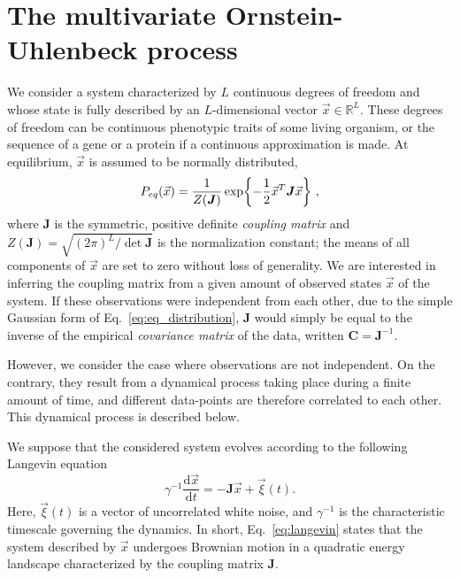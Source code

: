 \documentclass[preprint,amsmath,amssymb,superscriptaddress,showpacs,pre]{revtex4-1}
\let\originalleft\left
\let\originalright\right
\renewcommand{\left}{\mathopen{}\mathclose\bgroup\originalleft}
\renewcommand{\right}{\aftergroup\egroup\originalright}
\def\vx{\vec x}
\newcommand{\curlynormal}[1]{\exp\left\{-\frac{1}{2} #1 \right\}}
\begin{document}
\section{The multivariate Ornstein-Uhlenbeck process}
\label{sec:ornstein_uhlenbeck_dynamics}

We consider a system characterized by $L$ continuous degrees of freedom and whose state is fully described by an $L$-dimensional vector $\vx\in\mathbb{R}^L$. These degrees of freedom can be continuous phenotypic traits of some living organism, or the sequence of a gene or a protein if a continuous approximation is made. 
At equilibrium, $\vx$ is assumed to be normally distributed,
\begin{equation}
	P_{eq}(\vx) = \frac{1}{Z(\bm{J})}\curlynormal{\vx^T\bm{J}\vx}\ ,
	\label{eq:eq_distribution}
\end{equation}
where $\bm{J}$ is the symmetric, positive definite \emph{coupling matrix} and $Z(\bm{J}) = \sqrt{(2\pi)^L/\det \bm{J}}$ is the normalization constant; the means of all components of $\vx$ are set to zero without loss of generality. 
We are interested in inferring the coupling matrix from a given amount of observed states $\vx$ of the system.
If these observations were independent from each other, due to the simple Gaussian form of Eq.~\eqref{eq:eq_distribution}, $\bm{J}$ would simply be equal to the inverse of the empirical \emph{covariance matrix} of the data, written $\bm{C}=\bm{J}^{-1}$. 

However, we consider the case where observations are not independent. 
On the contrary, they result from a dynamical process taking place during a finite amount of time, and different data-points are therefore correlated to each other.
This dynamical process is described below.

We suppose that the considered system evolves according to the following Langevin equation 
\begin{equation}
	\gamma^{-1}\frac{\text{d}\vx}{\text{d}t} = - \bm{J}\vx + \vec{\xi}(t).
	\label{eq:langevin}
\end{equation}
Here, $\vec{\xi}(t)$ is a vector of uncorrelated white noise, and $\gamma^{-1}$ is the characteristic timescale governing the dynamics. 
In short, Eq.~\eqref{eq:langevin} states that the system described by $\vx$ undergoes Brownian motion in a quadratic energy landscape characterized by the coupling matrix $\bm{J}$. 
\end{document}

